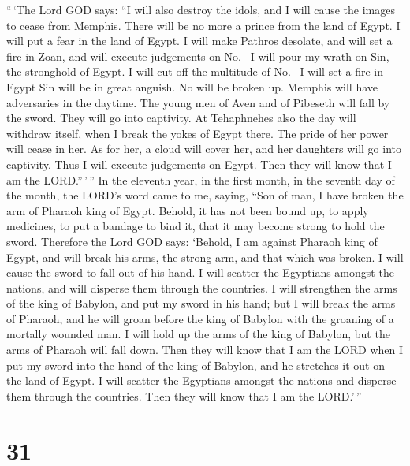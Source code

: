  ``\,`The Lord GOD says: ``I will also destroy the idols,
and I will cause the images to cease from Memphis. There will be no more
a prince from the land of Egypt. I will put a fear in the land of Egypt.
 I will make Pathros desolate, and will set a fire in
Zoan, and will execute judgements on No.~ I will pour my
wrath on Sin, the stronghold of Egypt. I will cut off the multitude of
No.~ I will set a fire in Egypt Sin will be in great
anguish. No will be broken up. Memphis will have adversaries in the
daytime.  The young men of Aven and of Pibeseth will fall
by the sword. They will go into captivity.  At
Tehaphnehes also the day will withdraw itself, when I break the yokes of
Egypt there. The pride of her power will cease in her. As for her, a
cloud will cover her, and her daughters will go into captivity.
 Thus I will execute judgements on Egypt. Then they will
know that I am the LORD.''\,'\,''  In the eleventh year,
in the first month, in the seventh day of the month, the LORD's word
came to me, saying,  ``Son of man, I have broken the arm
of Pharaoh king of Egypt. Behold, it has not been bound up, to apply
medicines, to put a bandage to bind it, that it may become strong to
hold the sword.  Therefore the Lord GOD says: `Behold, I
am against Pharaoh king of Egypt, and will break his arms, the strong
arm, and that which was broken. I will cause the sword to fall out of
his hand.  I will scatter the Egyptians amongst the
nations, and will disperse them through the countries.  I
will strengthen the arms of the king of Babylon, and put my sword in his
hand; but I will break the arms of Pharaoh, and he will groan before the
king of Babylon with the groaning of a mortally wounded man.
 I will hold up the arms of the king of Babylon, but the
arms of Pharaoh will fall down. Then they will know that I am the LORD
when I put my sword into the hand of the king of Babylon, and he
stretches it out on the land of Egypt.  I will scatter
the Egyptians amongst the nations and disperse them through the
countries. Then they will know that I am the LORD.'\,''

\hypertarget{section-29}{%
\section{31}\label{section-29}}

